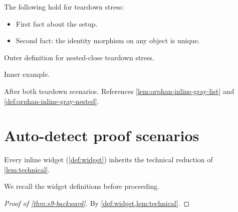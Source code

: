 \documentclass{article}
\begin{document}
\begin{lemma}\label{lem:orphan-inline-gray-list}
The following hold for teardown stress:
\begin{itemize}
  \item First fact about the setup.
  \item Second fact: the identity morphism on any object is unique.
\end{itemize}
\end{lemma}

\begin{definition}\label{def:orphan-inline-gray-nested}
Outer definition for nested-close teardown stress.
\begin{example}\label{ex:orphan-inline-gray-nested}
Inner example.
\end{example}
\end{definition}

\begin{theorem}\label{thm:orphan-inline-gray-after}
After both teardown scenarios.
References \cref{lem:orphan-inline-gray-list} and \cref{def:orphan-inline-gray-nested}.
\end{theorem}


\setcounter{section}{8}
\section{Auto-detect proof scenarios}
\label{sec:w05a1}

\begin{theorem}\label{thm:s9-backward}
Every inline widget (\cref{def:widget}) inherits the technical reduction
of \cref{lem:technical}.
\end{theorem}

We recall the widget definitions before proceeding.

\begin{proof}[Proof of \cref{thm:s9-backward}]
By \cref{def:widget,lem:technical}.
\end{proof}
\end{document}
